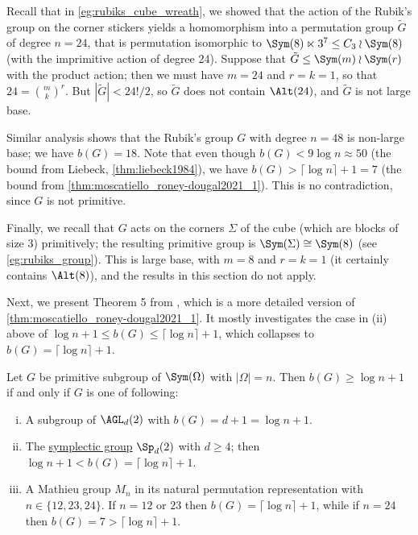 \begin{example}\label{eg:rubiks_group_large_base}
    Recall that in \autoref{eg:rubiks_cube_wreath}, we showed that the action of the Rubik's group on the corner stickers yields a homomorphism into a permutation group $\tilde G$ of degree $n = 24$, that is permutation isomorphic to $\Sym(8) \ltimes 3^7 \leq C_3 \wr \Sym(8)$ (with the imprimitive action of degree 24). Suppose that $\tilde G \leq \Sym(m) \wr \Sym(r)$ with the product action; then we must have $m = 24$ and $r = k = 1$, so that $24 = \binom{m}{k}^r$. But $|\tilde G| < 24!/2$, so $\tilde G$ does not contain $\Alt(24)$, and $\tilde G$ is not large base.

    Similar analysis shows that the Rubik's group $G$ with degree $n = 48$ is non-large base; we have $b(G) = 18$. Note that even though $b(G) < 9\log n \approx 50$ (the bound from Liebeck, \autoref{thm:liebeck1984}), we have $b(G) > \lceil\log n\rceil + 1 = 7$ (the bound from \autoref{thm:moscatiello_roney-dougal2021_1}). This is no contradiction, since $G$ is not primitive.

    Finally, we recall that $G$ acts on the corners $\Sigma$ of the cube (which are blocks of size 3) primitively; the resulting primitive group is $\Sym(\Sigma) \cong \Sym(8)$ (see \autoref{eg:rubiks_group}). This is large base, with $m = 8$ and $r = k = 1$ (it certainly contains $\Alt(8)$), and the results in this section do not apply.
\end{example}

Next, we present Theorem 5 from \cite{moscatiello_roney-dougal2021}, which is a more detailed version of \autoref{thm:moscatiello_roney-dougal2021_1}. It mostly investigates the case in (ii) above of $\log n + 1 \leq b(G) \leq \lceil\log n\rceil + 1$, which collapses to $b(G) = \lceil\log n\rceil + 1$.

\begin{theorem}\label{thm:moscatiello_roney-dougal2021_5}
    Let $G$ be primitive subgroup of $\Sym(\Omega)$ with $|\Omega| = n$. Then $b(G) \geq \log n + 1$ if and only if $G$ is one of following:
    \begin{enumerate}[(i)]
        \item A subgroup of $\AGL_d(2)$ with $b(G) = d + 1 = \log n + 1$.
        \item The \hyperref[def:symplectic_group]{symplectic group} $\Sp_d(2)$ with $d \geq 4$; then $\log n + 1 < b(G) = \lceil\log n\rceil + 1$. %
        \item A Mathieu group $M_n$ in its natural permutation representation with $n \in \{12,23,24\}$. If $n = 12$ or $23$ then $b(G) = \lceil\log n\rceil + 1$, while if $n = 24$ then $b(G) = 7 > \lceil\log n\rceil + 1$.
    \end{enumerate}
\end{theorem}

